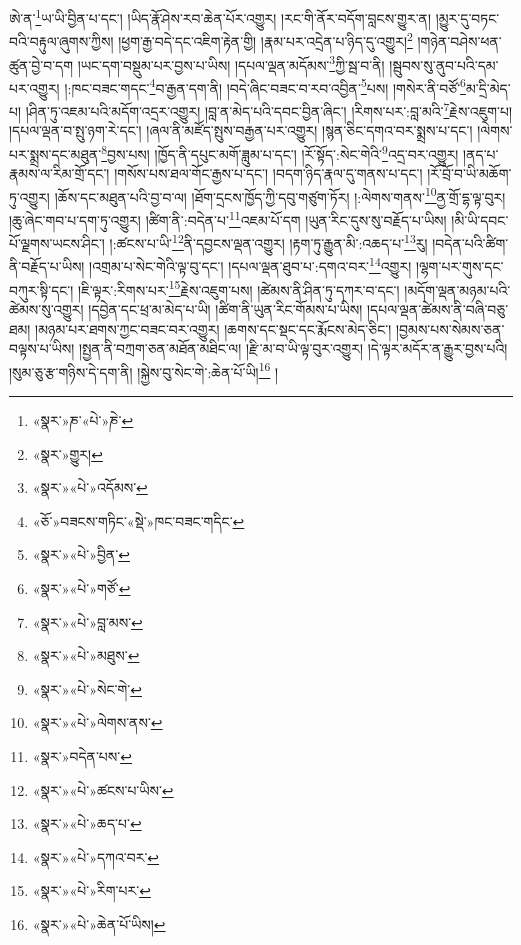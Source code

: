 ཨེ་ན་\footnote{«སྣར་»ཎ་«པེ་»ཎེ་}ཡ་ཡི་བྱིན་པ་དང་། །ཡིད་རྣོ་ཤེས་རབ་ཆེན་པོར་འགྱུར། །རང་གི་ནོར་བདོག་བླངས་གྱུར་ན། །མྱུར་དུ་བཏང་བའི་བརྟུལ་ཞུགས་ཀྱིས། །ཕྱག་རྒྱ་བདེ་དང་འཇིག་རྟེན་གྱི། །རྣམ་པར་འདྲེན་པ་ཉིད་དུ་འགྱུར།\footnote{«སྣར་»གྱུར།} །གཉེན་བཤེས་ཕན་ཚུན་བྱེ་བ་དག །ཡང་དག་བསྡུམ་པར་བྱས་པ་ཡིས། །དཔལ་ལྡན་མདོམས་\footnote{«སྣར་»«པེ་»འདོམས་}ཀྱི་སྦ་བ་ནི། །སྦུབས་སུ་ནུབ་པའི་དམ་པར་འགྱུར། །:ཁང་བཟང་གདང་\footnote{«ཅོ་»བཟངས་གཏིང་«སྡེ་»ཁང་བཟང་གདིང་}བ་རྒྱན་དག་ནི། །བདེ་ཞིང་བཟང་བ་རབ་འབྱིན་\footnote{«སྣར་»«པེ་»བྱིན་}པས། །གསེར་ནི་བཙོ་\footnote{«སྣར་»«པེ་»གཙོ་}མ་དྲི་མེད་པ། །ཤིན་ཏུ་འཇམ་པའི་མདོག་འདྲར་འགྱུར། །བླ་ན་མེད་པའི་དབང་བྱིན་ཞིང་། །རིགས་པར་:བླ་མའི་\footnote{«སྣར་»«པེ་»བླ་མས་}རྗེས་འཇུག་པ། །དཔལ་ལྡན་བ་སྤུ་ཉག་རེ་དང་། །ཞལ་ནི་མཛོད་སྤུས་བརྒྱན་པར་འགྱུར། །སྙན་ཅིང་དགའ་བར་སྨྲས་པ་དང་། །ལེགས་པར་སྨྲས་དང་མཐུན་\footnote{«སྣར་»«པེ་»མཐུས་}བྱས་པས། །ཁྱོད་ནི་དཔུང་མགོ་ཟླུམ་པ་དང་། །རོ་སྟོད་:སེང་གེའི་\footnote{«སྣར་»«པེ་»སེང་གེ་}འདྲ་བར་འགྱུར། །ནད་པ་རྣམས་ལ་རིམ་གྲོ་དང་། །གསོས་པས་ཐལ་གོང་རྒྱས་པ་དང་། །བདག་ཉིད་རྣལ་དུ་གནས་པ་དང་། །རོ་བྲོ་བ་ཡི་མཆོག་ཏུ་འགྱུར། །ཆོས་དང་མཐུན་པའི་བྱ་བ་ལ། །ཐོག་དྲངས་ཁྱོད་ཀྱི་དབུ་གཙུག་ཏོར། །:ལེགས་གནས་\footnote{«སྣར་»«པེ་»ལེགས་ནས་}ནྱ་གྲོ་དྷ་ལྟ་བུར། །ཆུ་ཞེང་གབ་པ་དག་ཏུ་འགྱུར། །ཚིག་ནི་:བདེན་པ་\footnote{«སྣར་»བདེན་པས་}འཇམ་པོ་དག །ཡུན་རིང་དུས་སུ་བརྗོད་པ་ཡིས། །མི་ཡི་དབང་པོ་ལྗགས་ཡངས་ཤིང་། །:ཚངས་པ་ཡི་\footnote{«སྣར་»«པེ་»ཚངས་པ་ཡིས་}ནི་དབྱངས་ལྡན་འགྱུར། །རྟག་ཏུ་རྒྱུན་མི་:འཆད་པ་\footnote{«སྣར་»«པེ་»ཆད་པ་}རུ། །བདེན་པའི་ཚིག་ནི་བརྗོད་པ་ཡིས། །འགྲམ་པ་སེང་གེའི་ལྟ་བུ་དང་། །དཔལ་ལྡན་ཐུབ་པ་:དགའ་བར་\footnote{«སྣར་»«པེ་»དཀའ་བར་}འགྱུར། །ལྷག་པར་གུས་དང་བཀུར་སྟི་དང་། །ཇི་ལྟར་:རིགས་པར་\footnote{«སྣར་»«པེ་»རིག་པར་}རྗེས་འཇུག་པས། །ཚེམས་ནི་ཤིན་ཏུ་དཀར་བ་དང་། །མདོག་ལྡན་མཉམ་པའི་ཚེམས་སུ་འགྱུར། །དབྱེན་དང་ཕྲ་མ་མེད་པ་ཡི། །ཚིག་ནི་ཡུན་རིང་གོམས་པ་ཡིས། །དཔལ་ལྡན་ཚེམས་ནི་བཞི་བཅུ་ཐམ། །མཉམ་པར་ཐགས་ཀྱང་བཟང་བར་འགྱུར། །ཆགས་དང་སྡང་དང་རྨོངས་མེད་ཅིང་། །བྱམས་པས་སེམས་ཅན་བལྟས་པ་ཡིས། །སྤྱན་ནི་བཀྲག་ཅན་མཐོན་མཐིང་ལ། །རྫི་མ་བ་ཡི་ལྟ་བུར་འགྱུར། །དེ་ལྟར་མདོར་ན་རྒྱུར་བྱས་པའི། །སུམ་ཅུ་རྩ་གཉིས་དེ་དག་ནི། །སྐྱེས་བུ་སེང་གེ་:ཆེན་པོ་ཡི།\footnote{«སྣར་»«པེ་»ཆེན་པོ་ཡིས།} །
